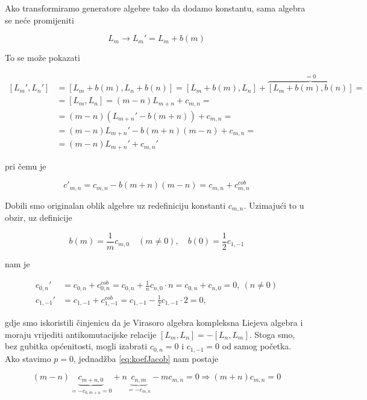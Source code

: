 \noindent Ako transformiramo generatore algebre tako da dodamo konstantu, sama algebra se neće promijeniti

\begin{equation}
L_m\rightarrow L_m'=L_m+b(m)
\end{equation}

\noindent To se može pokazati

\begin{equation*}
\begin{split}
[L_m',L_n'] &=[L_m+b(m),L_n+b(n)]=[L_m+b(m),L_n]+\overbrace{[L_m+b(m),b(n)]}^{=0}=\\
&=[L_m,L_n]=(m-n)L_{m+n}+c_{m,n}=\\
&=(m-n)(L_{m+n}'-b(m+n))+c_{m,n}=\\
&=(m-n)L_{m+n}'-b(m+n)(m-n)+c_{m,n}=\\
&=(m-n)L_{m+n}'+c_{m,n}'
\end{split}
\end{equation*}

\noindent pri čemu je 

\begin{equation*}
c'_{m,n}=c_{m,n}-b(m+n)(m-n)=c_{m,n}+c_{m,n}^{cob}
\end{equation*}

\noindent Dobili smo originalan oblik algebre uz redefiniciju konstanti $c_{m,n}$. Uzimajući to u obzir, uz definicije

\begin{equation*}
b(m)=\frac{1}{m}c_{m,0} \quad (m\neq 0),\quad 
b(0)=\frac{1}{2}c_{1,-1}
\end{equation*}

\noindent nam je

\begin{equation*}
\begin{split}
c_{0,n}'&=c_{0,n}+c_{0,n}^{cob}=c_{0,n}+\frac{1}{n}c_{n,0}\cdot n=c_{0,n}+c_{n,0}=0,\ (n\neq 0)\\
c_{1,-1}'&=c_{1,-1}+c_{1,-1}^{cob}=c_{1,-1}-\frac{1}{2}c_{1,-1}\cdot 2=0,
\end{split}
\end{equation*}

\noindent gdje smo iskoristili činjenicu da je Virasoro algebra kompleksna Liejeva algebra i moraju vrijediti antikomutacijske relacije $[L_m,L_n]=-[L_n,L_m]$. Stoga smo, bez gubitka općenitosti, mogli izabrati $c_{0,n}=0$ i $c_{1,-1}=0$ od samog početka. Ako stavimo $p=0$, jednadžba \eqref{eq:koefJacob} nam postaje

\begin{equation*}
(m-n)\underbrace{c_{m+n,0}}_{=-c_{0,m+n}=0}+n\underbrace{c_{n,m}}_{=-c_{m,n}}-mc_{m,n}=0\Rightarrow (m+n)c_{m,n}=0
\end{equation*}

